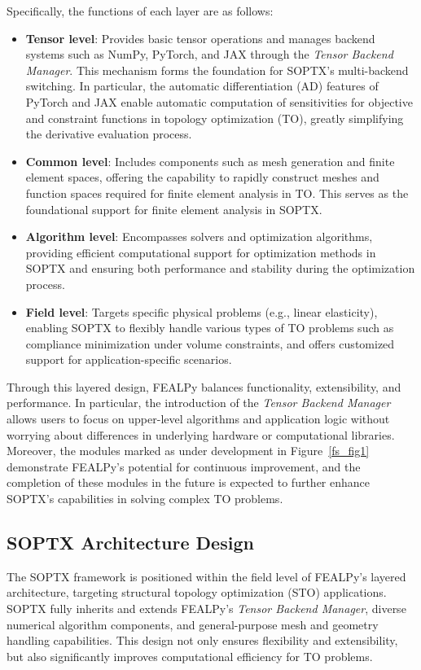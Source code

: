 \documentclass[mathpazo]{cicp}
\begin{document}
Specifically, the functions of each layer are as follows:
\begin{itemize} 
	\item \textbf{Tensor level}: Provides basic tensor operations and manages backend systems such as NumPy, PyTorch, and JAX through the \textit{Tensor Backend Manager}. This mechanism forms the foundation for SOPTX's multi-backend switching. In particular, the automatic differentiation (AD) features of PyTorch and JAX enable automatic computation of sensitivities for objective and constraint functions in topology optimization (TO), greatly simplifying the derivative evaluation process.
	\item \textbf{Common level}: Includes components such as mesh generation and finite element spaces, offering the capability to rapidly construct meshes and function spaces required for finite element analysis in TO. This serves as the foundational support for finite element analysis in SOPTX.
	\item \textbf{Algorithm level}: Encompasses solvers and optimization algorithms, providing efficient computational support for optimization methods in SOPTX and ensuring both performance and stability during the optimization process.
	\item \textbf{Field level}: Targets specific physical problems (e.g., linear elasticity), enabling SOPTX to flexibly handle various types of TO problems such as compliance minimization under volume constraints, and offers customized support for application-specific scenarios.
\end{itemize}

Through this layered design, FEALPy balances functionality, extensibility, and performance. In particular, the introduction of the \textit{Tensor Backend Manager} allows users to focus on upper-level algorithms and application logic without worrying about differences in underlying hardware or computational libraries. Moreover, the modules marked as under development in Figure~\ref{fs_fig1} demonstrate FEALPy’s potential for continuous improvement, and the completion of these modules in the future is expected to further enhance SOPTX’s capabilities in solving complex TO problems.

\subsection{SOPTX Architecture Design}
The SOPTX framework is positioned within the field level of FEALPy’s layered architecture, targeting structural topology optimization (STO) applications. SOPTX fully inherits and extends FEALPy’s \textit{Tensor Backend Manager}, diverse numerical algorithm components, and general-purpose mesh and geometry handling capabilities. This design not only ensures flexibility and extensibility, but also significantly improves computational efficiency for TO problems.
\end{document}
